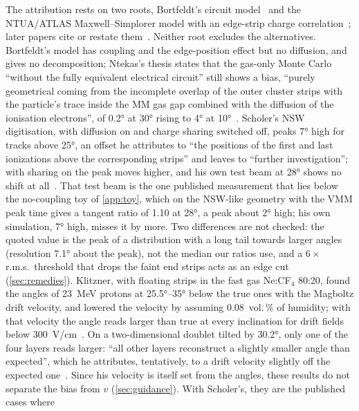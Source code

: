 The attribution rests on two roots, Bortfeldt's circuit model~\cite{Bortfeldt2014} and the NTUA/ATLAS Maxwell--Simplorer model
with an edge-strip charge correlation~\cite{Ntekas2016}; later papers cite or restate them~\cite{Sessa2014,Vanadia2015,Rinnagel2019,Alexeev2019,Farinelli2019}.
Neither root excludes the alternatives. Bortfeldt's model has coupling and the edge-position effect but no diffusion, and
gives no decomposition; Ntekas's thesis states that the gas-only Monte Carlo ``without the fully equivalent electrical circuit''
still shows a bias, ``purely geometrical coming from the incomplete overlap of the outer cluster strips with the particle's
trace inside the MM gas gap combined with the diffusion of the ionisation electrons'', of \ang{0.2} at \ang{30} rising to \ang{4} at
\ang{10}~\cite{Ntekas2016}. Scholer's NSW digitisation, with diffusion on and charge sharing switched off, peaks \ang{7} high for
tracks above \ang{25}, an offset he attributes to ``the positions of the first and last ionizations above the corresponding
strips'' and leaves to ``further investigation''; with sharing on the peak moves higher, and his own test beam at \ang{28} shows no
shift at all~\cite{Scholer2021}. That test beam is the one published measurement that lies below the no-coupling
toy of \cref{app:toy}, which on the NSW-like geometry with the VMM peak time gives a tangent ratio of 1.10 at \ang{28}, a
peak about \ang{2} high; his own simulation, \ang{7} high, misses it by more. Two differences are not checked: the quoted value is
the peak of a distribution with a long tail towards larger angles (resolution \ang{7.1} about the peak), not the median our
ratios use, and a $6\times$ r.m.s.\ threshold that drops the faint end strips acts as an edge cut (\cref{sec:remedies}).
Klitzner, with floating strips in the fast gas Ne:CF$_4$ 80:20, found the angles of 23~MeV protons at
\ang{25.5}--\ang{35} below the true ones with the Magboltz drift velocity, and lowered the velocity by assuming
0.08~vol.\,\% of humidity; with that velocity the angle reads larger than true at every inclination for drift fields
below 300~V/cm~\cite{Klitzner2016}. On a two-dimensional doublet tilted by \ang{30.2}, only one of the four layers reads
larger: ``all other layers reconstruct a slightly smaller angle than expected'', which he attributes, tentatively, to a
drift velocity slightly off the expected one~\cite{Klitzner2016}. Since his velocity is itself set from the angles, these
results do not separate the bias from $v$ (\cref{sec:guidance}). With Scholer's, they are the published cases where

